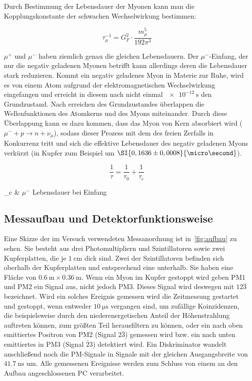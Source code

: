 \documentclass[slug=LM, room=Andreas-Schubert-Bau\,\ K\ 1A, supervisor=Anne-Sophie\ Berthold, coursedate=13.\ 12.\ 2019]{../../Lab_Report_LaTeX/lab_report}
\begin{document}
Durch Bestimmung der Lebensdauer der Myonen kann man die Kopplungskonstante der schwachen
Wechselwirkung bestimmen:

\begin{equation} \label{eq:kopplkonst}
        \tau_\mu^{-1} = G_F^2 \cdot \frac{m_\mu^5}{192 \pi^3}
\end{equation}

\(\mu^+\) und \(\mu^-\) haben ziemlich genau die gleichen Lebensdauern.
Der \(\mu^-\)-Einfang, der nur die negativ geladenen Myonen betrifft kann allerdings deren
die Lebensdauer stark reduzieren.
Kommt ein negativ geladenes Myon in Materie zur Ruhe, wird es von einem Atom aufgrund der
elektromagnetischen Wechselwirkung eingefangen und erreicht in diesem nach nicht einmal
\(\SI{e-12}{\second}\) den Grundzustand. Nach erreichen des Grundzustandes überlappen die
Wellenfunktionen des Atomkerns und des Myons miteinander. Durch diese Überlappung kann es dazu
kommen, dass das Myon von Kern absorbiert wird (\(\mu^- + p \rightarrow n + \nu_\mu\)), sodass
dieser Prozess mit dem des freien Zerfalls in Konkurrenz tritt und sich die effektive Lebensdauer
des negativ geladenen Myons verkürzt (in Kupfer zum Beispiel um \(\SI{0,1636 \pm 0,0008}{\micro\second}\)).

\begin{equation}\label{eq:efflebenszeit}
        \frac{1}{\tau} = \frac{1}{\tau_0} + \frac{1}{\tau_c}
\end{equation}

\begin{conditions}
        \tau_c & \(\mu^-\) Lebensdauer bei Einfang
\end{conditions}

\subsection{Messaufbau und Detektorfunktionsweise}
\label{sec:aufbau}

Eine Skizze der im Versuch verwendeten Messanordnung ist in~\ref{fig:aufbau} zu sehen.
Sie besteht aus drei Photomultipliern und Szintillatoren sowie zwei Kupferplatten, die je
\(\SI{1}{\centi\metre}\) dick sind. Zwei der Szintillatoren befinden sich oberhalb der Kupferplatten
und entsprechend eine unterhalb. Sie haben eine Fläche von \(\SI{0,6}{\metre} \times \SI{0,36}{\metre}\).
Wenn ein Myon im Kupfer gestoppt wird geben PM1 und PM2 ein Signal aus, nicht jedoch PM3.
Dieses Signal wird deswegen mit \(\textit{12}\bar{\textit{3}}\) bezeichnet. Wird ein
solches Ereignis gemessen wird die Zeitmessung gestartet und gestoppt, wenn entweder
\(\SI{10}{\micro\second}\) vergangen sind, um zufällige Koinzidenzen, die beispielsweise durch
den niederenergetischen Anteil der Höhenstrahlung auftreten können, zum größten Teil
herausfiltern zu können, oder
ein nach oben emittiertes Positron von PM2 (Signal \(\textit{2}\bar{\textit{3}}\)) gemessen wird 
bzw. ein nach unten emittiertes in
PM3 (Signal \(\bar{\textit{2}}\textit{3}\)) detektiert wird. Ein Diskriminator wandelt anschließend 
noch die PM-Signale in Signale mit der
gleichen Ausgangsbreite von \(\SI{41,7}{\nano\second}\) um. Alle gemessenen Ereignisse werden
zum Schluss von einem an den Aufbau angeschlossenen PC verarbeitet.
\end{document}
